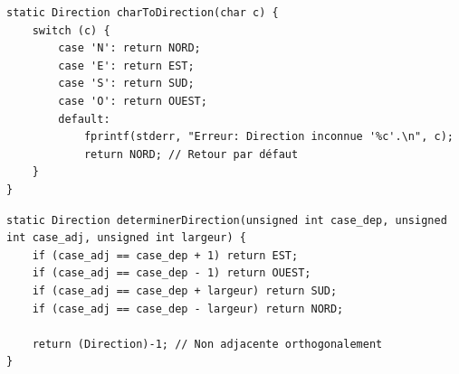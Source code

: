 \begin{lstlisting}[caption={charToDirection}]
static Direction charToDirection(char c) {
    switch (c) {
        case 'N': return NORD;
        case 'E': return EST;
        case 'S': return SUD;
        case 'O': return OUEST;
        default: 
            fprintf(stderr, "Erreur: Direction inconnue '%c'.\n", c);
            return NORD; // Retour par défaut
    }
}
\end{lstlisting}

\begin{lstlisting}[caption={determinerDirection}]
static Direction determinerDirection(unsigned int case_dep, unsigned int case_adj, unsigned int largeur) {
    if (case_adj == case_dep + 1) return EST;
    if (case_adj == case_dep - 1) return OUEST;
    if (case_adj == case_dep + largeur) return SUD;
    if (case_adj == case_dep - largeur) return NORD;
    
    return (Direction)-1; // Non adjacente orthogonalement
}
\end{lstlisting}

